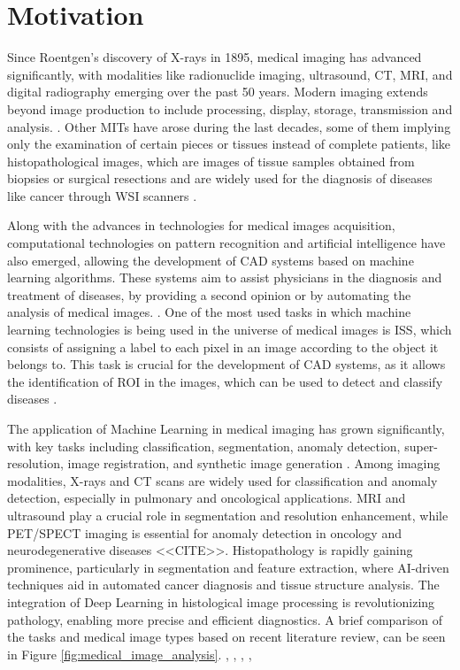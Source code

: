 \section{Motivation}\label{sec:motivation}

Since Roentgen’s discovery of X-rays in 1895, medical imaging has
advanced significantly, with modalities like radionuclide imaging,
ultrasound, CT, MRI, and digital radiography emerging over the past
50 years. Modern imaging extends beyond image production to include
processing, display, storage, transmission and analysis.
\cite{Zhou2021}.
Other \gls{MITs} have arose during the last decades, some of them
implying only the examination of certain pieces or tissues
instead of complete patients, like histopathological images, which
are images of tissue samples obtained from biopsies or surgical
resections and are widely used for the diagnosis of diseases like
cancer through \gls{WSI} scanners \cite{Rashmi2021}.

Along with the advances in technologies for medical images acquisition,
computational technologies on pattern recognition and artificial intelligence
have also emerged, allowing the development of \gls{CAD} systems based on
machine learning algorithms. These systems aim to assist physicians
in the diagnosis and treatment of diseases, by providing a second
opinion or by automating the analysis of medical images.
\cite{Panayides2020}. One of the most used tasks in which machine
learning technologies is being used in the universe of medical images
is \gls{ISS}, which consists of assigning a label to each pixel in an image
according to the object it belongs to. This task is crucial for the development
of \gls{CAD} systems, as it allows the identification of \gls{ROI} in
the images, which can be used to detect and classify diseases
\cite{Azad2024}.

The application of Machine Learning in medical imaging has grown
significantly, with key tasks including classification, segmentation,
anomaly detection, super-resolution, image registration, and
synthetic image generation \cite{Brito-Pacheco2025}. Among imaging
modalities, X-rays and CT scans are widely used for classification
and anomaly detection, especially in pulmonary and oncological
applications. MRI and ultrasound play a crucial role in segmentation
and resolution enhancement, while PET/SPECT imaging is essential for
anomaly detection in oncology and neurodegenerative diseases <<CITE>>.
Histopathology is rapidly gaining prominence, particularly in segmentation and
feature extraction, where AI-driven techniques aid in automated
cancer diagnosis and tissue structure analysis. The integration of
Deep Learning in histological image processing is revolutionizing
pathology, enabling more precise and efficient diagnostics. A brief
comparison of the tasks and medical image types
based on recent literature review, can be seen in Figure
\ref{fig:medical_image_analysis}. \cite{YuEtAl2025},
\cite{Brito-Pacheco2025}, \cite{RyouEtAl2025},
\cite{DingyiEtAl2025}, \cite{BehnazEtAl2025}

